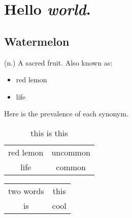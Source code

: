 

\section{Hello \textit{world}.}

\subsection{Watermelon}

(n.) A sacred fruit. Also known as:

\begin{itemize}
    \item red lemon
    \item life
\end{itemize}

Here is the prevalence of each synonym.

\begin{table}
    \centering
    \begin{tabular}{c c}
        red lemon & uncommon \\
        life & common
    \end{tabular}
    \caption{this is this}
\end{table}

\begin{table}
    \centering
    \begin{tabular}{c c}
        two words & this \\
        is & cool
    \end{tabular}
\end{table}


